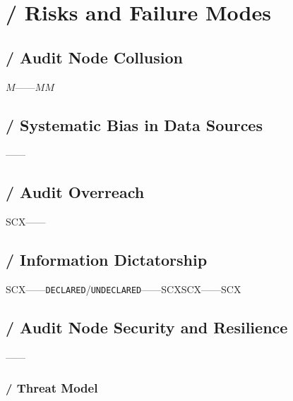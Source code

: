 \documentclass[12pt,a4paper]{article}
\theoremstyle{remark}
\newcommand{\UNDECLARED}{\texttt{UNDECLARED}}
\newcommand{\DECLARED}{\texttt{DECLARED}}
\begin{document}
\section{ / Risks and Failure Modes}

\subsection{ / Audit Node Collusion}

$M$——$M$$M$

\subsection{ / Systematic Bias in Data Sources}

——

\subsection{ / Audit Overreach}

SCX——\textbf{}

\subsection{ / Information Dictatorship}

SCX——\DECLARED/\UNDECLARED{}——SCXSCX——SCX

\subsection{ / Audit Node Security and Resilience}

——

\subsubsection{ / Threat Model}
\end{document}
